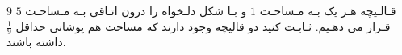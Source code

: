 \EXERCISE
$9$
قـالـیچه هـر یک بـه مـساحـت
$1$
 و بـا شکل دلـخواه را درون اتـاقی بـه مـساحـت
$5$
 قـرار می دهـیم. ثـابـت کنید دو قالیچه وجود دارند که مساحت هم پوشانی حداقل
$\frac{1}{9}$
 داشته باشند.